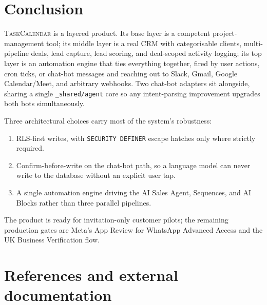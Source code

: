 \documentclass[11pt,a4paper,oneside]{article}
\newcommand{\tc}{\textsc{TaskCalendar}}
\newcommand{\code}[1]{\texttt{\small #1}}
\begin{document}
\section{Conclusion}

\tc{} is a layered product. Its base layer is a competent project-
management tool; its middle layer is a real CRM with categorisable
clients, multi-pipeline deals, lead capture, lead scoring, and
deal-scoped activity logging; its top layer is an automation engine
that ties everything together, fired by user actions, cron ticks, or
chat-bot messages and reaching out to Slack, Gmail, Google
Calendar/Meet, and arbitrary webhooks. Two chat-bot adapters sit
alongside, sharing a single \code{\_shared/agent} core so any
intent-parsing improvement upgrades both bots simultaneously.

Three architectural choices carry most of the system's robustness:

\begin{enumerate}
  \item RLS-first writes, with \code{SECURITY DEFINER} escape hatches
    only where strictly required.
  \item Confirm-before-write on the chat-bot path, so a language
    model can never write to the database without an explicit user
    tap.
  \item A single automation engine driving the AI Sales Agent,
    Sequences, and AI Blocks rather than three parallel pipelines.
\end{enumerate}

The product is ready for invitation-only customer pilots; the
remaining production gates are Meta's App Review for WhatsApp
Advanced Access and the UK Business Verification flow.

\section*{\color{accent}References and external documentation}
\end{document}
